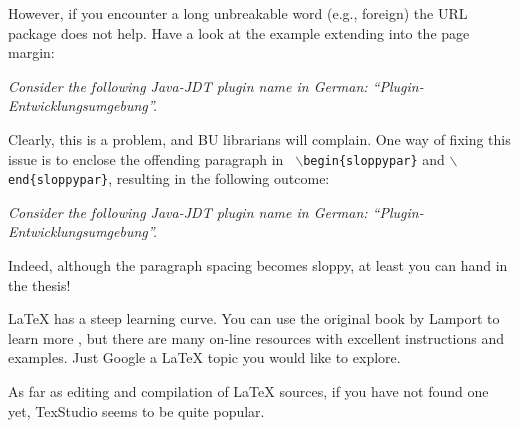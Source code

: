 However, if you encounter a long unbreakable word (e.g., foreign) the URL
package does not help. Have a look at the example extending into the page
margin:

\bigskip

{\it Consider the following Java-JDT plugin name in German: "`Plugin-Entwicklungsumgebung"'.}

\bigskip

Clearly, this is a problem, and BU librarians will complain. One way of fixing
this issue is to enclose the offending paragraph in {\tt
	$\backslash$begin\{sloppypar\}} and {\tt $\backslash$end\{sloppypar\}},
resulting in the following outcome:

\bigskip

\begin{sloppypar}
	{\it Consider the following Java-JDT plugin name in German:
		"`Plugin-Entwicklungsumgebung"'.}
\end{sloppypar}

\bigskip

Indeed, although the paragraph spacing becomes sloppy, at least you can hand in
the thesis!


LaTeX has a steep learning curve. You can use the original book by Lamport to
learn more \cite{lamport1985:latex}, but there are many on-line resources with
excellent instructions and examples. Just Google a LaTeX topic you would like to
explore.

As far as editing and compilation of LaTeX sources, if you have not found one
yet, TexStudio seems to be quite popular.